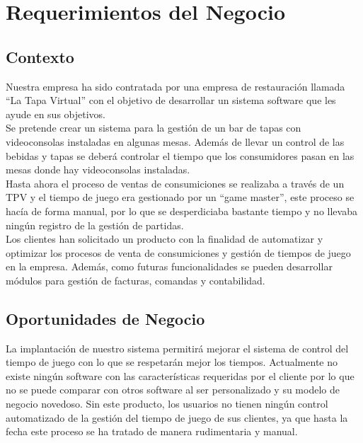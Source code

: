 \documentclass[a4paper,11pt]{article}
\begin{document}
	\newpage
	\tableofcontents
	\newpage
	\section{Requerimientos del Negocio}
		\subsection{Contexto}
			Nuestra empresa ha sido contratada por una empresa de restauración llamada “La Tapa Virtual” con el objetivo de 			desarrollar un sistema software que les ayude en sus objetivos.\\

			Se pretende crear un sistema para la gestión de un bar de tapas con videoconsolas instaladas en algunas mesas. 				Además de llevar un control de las bebidas y tapas se deberá controlar el tiempo que los consumidores pasan en 					las mesas donde hay videoconsolas instaladas.\\

			Hasta ahora el proceso de ventas de consumiciones se realizaba a través de un TPV y el tiempo de juego era  					gestionado por un “game master”, este proceso se hacía de forma manual, por lo que se desperdiciaba bastante 					tiempo y no llevaba ningún registro de la gestión de partidas.\\
			
			Los clientes han solicitado un producto con la finalidad de automatizar y optimizar los procesos de venta de 					consumiciones y gestión de tiempos de juego en la empresa. Además, como futuras funcionalidades se pueden 					desarrollar módulos para gestión de facturas, comandas y contabilidad.
		\subsection{Oportunidades de Negocio}
			La implantación de nuestro sistema permitirá mejorar el sistema de control del tiempo de juego con lo que se 					respetarán mejor los tiempos. Actualmente no existe ningún software con las características requeridas por el 					cliente por lo que no se puede comparar con otros software al ser personalizado y su modelo de negocio 						novedoso. Sin este producto, los usuarios no tienen ningún control automatizado de la gestión del tiempo de 					juego de sus clientes, ya que hasta la fecha este proceso se ha tratado de manera rudimentaria y manual.
\end{document}
